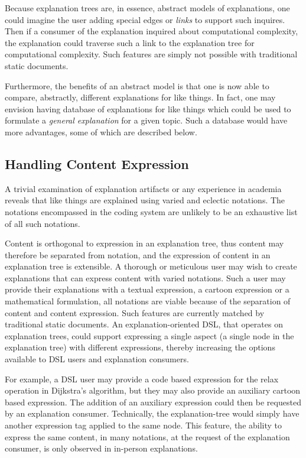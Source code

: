 \documentclass[sigconf]{acmart}
\begin{document}
Because explanation trees are, in essence, abstract models of explanations, one
could imagine the user adding special edges or \emph{links} to support such
inquires. Then if a consumer of the explanation inquired about computational
complexity, the explanation could traverse such a link to the explanation tree
for computational complexity. Such features are simply not possible with
traditional static documents.

Furthermore, the benefits of an abstract model is that one is now able to
compare, abstractly, different explanations for like things. In fact, one may
envision having database of explanations for like things which could be used to
formulate a \emph{general explanation} for a given topic. Such a database would
have more advantages, some of which are described below.

\subsection{Handling Content Expression}
\label{sec:dis:expr}
A trivial examination of explanation artifacts or any experience in academia
reveals that like things are explained using varied and eclectic notations. The
notations encompassed in the coding system are unlikely to be an exhaustive list
of all such notations.

Content is orthogonal to expression in an explanation tree, thus content may
therefore be separated from notation, and the expression of content in an
explanation tree is extensible. A thorough or meticulous user may wish to create
explanations that can express content with varied notations. Such a user may
provide their explanations with a textual expression, a cartoon expression or a
mathematical formulation, all notations are viable because of the separation of
content and content expression. Such features are currently matched by
traditional static documents. An explanation-oriented DSL, that operates on
explanation trees, could support expressing a single aspect (a single node in
the explanation tree) with different expressions, thereby increasing the options
available to DSL users and explanation consumers.

For example, a DSL user may provide a code based expression for the relax
operation in Dijkstra's algorithm, but they may also provide an auxiliary
cartoon based expression. The addition of an auxiliary expression could then be
requested by an explanation consumer. Technically, the explanation-tree would
simply have another expression tag applied to the same node. This feature, the
ability to express the same content, in many notations, at the request of the
explanation consumer, is only observed in in-person explanations. 
\end{document}
